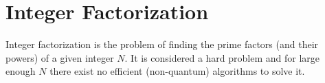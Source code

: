 

\chapter{Integer Factorization}

Integer factorization is the problem of finding the prime factors (and their powers) of a given integer $N$. It is considered a hard problem and for large enough $N$ there exist no efficient (non-quantum) algorithms to solve it.
